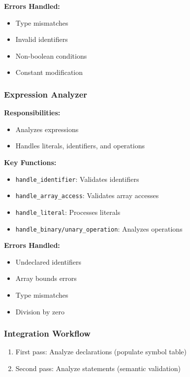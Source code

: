 \documentclass[12pt,a4paper]{article}
\begin{document}
\textbf{Errors Handled:}
\begin{itemize}
    \item Type mismatches
    \item Invalid identifiers
    \item Non-boolean conditions
    \item Constant modification
\end{itemize}

\subsubsection{Expression Analyzer}

\textbf{Responsibilities:}
\begin{itemize}
    \item Analyzes expressions
    \item Handles literals, identifiers, and operations
\end{itemize}

\textbf{Key Functions:}
\begin{itemize}
    \item \texttt{handle\_identifier}: Validates identifiers
    \item \texttt{handle\_array\_access}: Validates array accesses
    \item \texttt{handle\_literal}: Processes literals
    \item \texttt{handle\_binary/unary\_operation}: Analyzes operations
\end{itemize}

\textbf{Errors Handled:}
\begin{itemize}
    \item Undeclared identifiers
    \item Array bounds errors
    \item Type mismatches
    \item Division by zero
\end{itemize}

\subsubsection{Integration Workflow}

\begin{enumerate}
    \item First pass: Analyze declarations (populate symbol table)
    \item Second pass: Analyze statements (semantic validation)
\end{enumerate}
\end{document}
